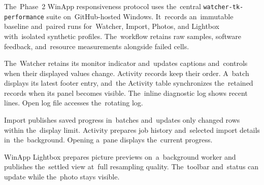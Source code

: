 \documentclass[11pt,a4paper]{article}
\newcommand{\codeword}[1]{\nolinkurl{#1}}
\begin{document}
The~Phase~2 WinApp responsiveness protocol uses the~central
\codeword{watcher-tk-performance} suite on~GitHub-hosted Windows. It~records
an~immutable baseline and~paired runs for~Watcher, Import, Photos, and
Lightbox with~isolated synthetic profiles. The~workflow retains raw samples,
software feedback, and~resource measurements alongside failed cells.

The~Watcher retains its monitor indicator and~updates captions and~controls
when their displayed values change. Activity records keep their order.
A~batch displays its latest footer entry, and~the Activity table
synchronizes the~retained records when its panel becomes visible.
The~inline diagnostic log shows recent lines. Open log file accesses
the~rotating log.

Import publishes saved progress in~batches and~updates only changed rows
within the~display limit. Activity prepares job history and~selected import
details in~the~background. Opening a~pane displays the~current progress.

WinApp Lightbox prepares picture previews on~a~background worker and
publishes the~settled view at~full resampling quality. The~toolbar and~status
can update while the~photo stays visible.
\end{document}
